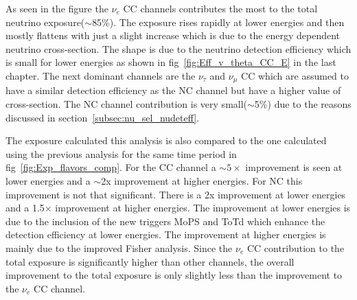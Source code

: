 As seen in the figure the $\nu_e$ CC channels contributes the most to the total neutrino exposure($\sim$85\%). The exposure rises rapidly at lower energies and then mostly flattens with just a slight increase which is due to the energy dependent neutrino cross-section. The shape is due to the neutrino detection efficiency which is small for lower energies as shown in fig~\ref{fig:Eff_v_theta_CC_E} in the last chapter. The next dominant channels are the $\nu_{\tau}$ and $\nu_{\mu}$ CC which are assumed to have a similar detection efficiency as the NC channel but have a higher value of cross-section. The NC channel contribution is very small($\sim$5\%) due to the reasons discussed in section~\ref{subsec:nu_sel_nudeteff}.  

The exposure calculated this analysis is also compared to the one calculated using the previous analysis for the same time period in fig~\ref{fig:Exp_flavors_comp}. For the CC channel a $\sim 5 \times$ improvement is seen at lower energies and a $\sim$2x improvement at higher energies. For NC this improvement is not that significant. There is a 2x improvement at lower energies and a 1.5$\times$ improvement at higher energies. The improvement at lower energies is due to the inclusion of the new triggers MoPS and ToTd which enhance the detection efficiency at lower energies. The improvement at higher energies is mainly due to the improved Fisher analysis. Since the $\nu_e$ CC contribution to the total exposure is significantly higher than other channels, the overall improvement to the total exposure is only slightly less than the improvement to the $\nu_e$ CC channel. 

